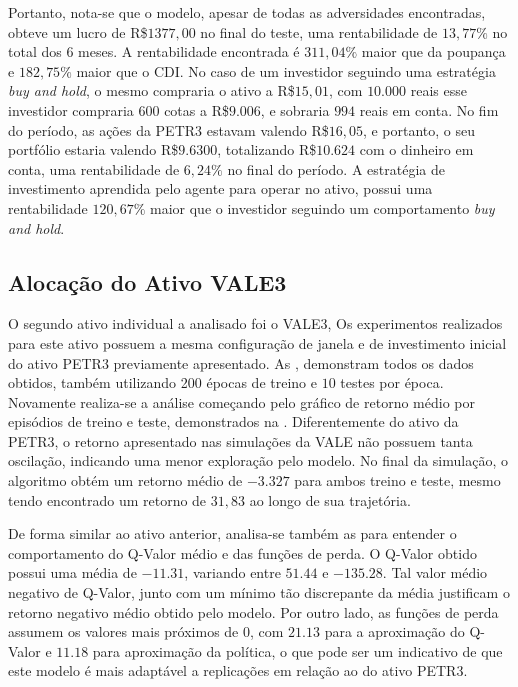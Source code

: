 Portanto, nota-se que o modelo, apesar de todas as adversidades encontradas, obteve um lucro de R\$$1377,00$ no final do teste, uma rentabilidade de $13,77\%$ no total dos 6 meses. A rentabilidade encontrada é $311,04\%$ maior que da poupança e $182,75\%$ maior que o \acrshort{CDI}. No caso de um investidor seguindo uma estratégia \emph{buy and hold}, o mesmo compraria o ativo a R\$$15,01$, com $10.000$ reais esse investidor compraria $600$ cotas a R\$$9.006$, e sobraria $994$ reais em conta. No fim do período, as ações da PETR3 estavam valendo R\$$16,05$, e portanto, o seu portfólio estaria valendo R\$$9.6300$, totalizando R\$$10.624$ com o dinheiro em conta, uma rentabilidade de $6,24\%$ no final do período. A estratégia de investimento aprendida pelo agente para operar no ativo, possui uma rentabilidade $120,67\%$ maior que o investidor seguindo um comportamento \emph{buy and hold}.
 
\subsection{Alocação do Ativo VALE3}

O segundo ativo individual a analisado foi o VALE3, Os experimentos realizados para este ativo possuem a mesma configuração de janela e de investimento inicial do ativo PETR3 previamente apresentado. As , demonstram todos os dados obtidos, também utilizando 200 épocas de treino e $10$ testes por época. Novamente realiza-se a análise começando pelo gráfico de retorno médio por episódios de treino e teste, demonstrados na . Diferentemente do ativo da PETR3, o retorno apresentado nas simulações da VALE não possuem tanta oscilação, indicando uma menor exploração pelo modelo. No final da simulação, o algoritmo obtém um retorno médio de $-3.327$ para ambos treino e teste, mesmo tendo encontrado um retorno de $31,83$ ao longo de sua trajetória. 


De forma similar ao ativo anterior, analisa-se também as  para entender o comportamento do Q-Valor médio e das funções de perda. O Q-Valor obtido possui uma média de $-11.31$, variando entre $51.44$ e $-135.28$. Tal valor médio negativo de Q-Valor, junto com um mínimo tão discrepante da média justificam o retorno negativo médio obtido pelo modelo. Por outro lado, as funções de perda assumem os valores mais próximos de $0$, com $21.13$ para a aproximação do Q-Valor e $11.18$ para aproximação da política, o que pode ser um indicativo de que este modelo é mais adaptável a replicações em relação ao do ativo PETR3. 

